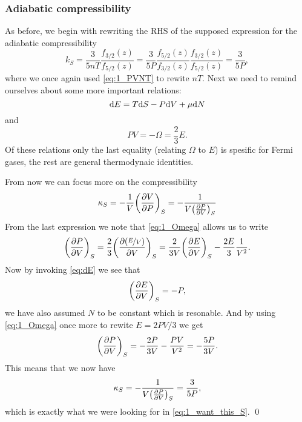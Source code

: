 \documentclass[11pt,letter, swedish, english
]{article}
\begin{document}
\subsubsection{Adiabatic compressibility}
As before, we begin with rewriting the RHS of the supposed expression
for the adiabatic compressibility
\begin{equation}\label{eq:1_want_this_S}
k_S=\frac{3}{5nT}\frac{f_{3/2}(z)}{f_{5/2}(z)}
=\frac{3}{5P}\frac{f_{5/2}(z)}{f_{3/2}(z)}\frac{f_{3/2}(z)}{f_{5/2}(z)}
=\frac{3}{5P},
\end{equation}
where we once again used \eqref{eq:1_PVNT} to rewite $nT$. Next we
need to remind ourselves about some more important relations:
\begin{equation}\label{eq:dE}
\mathrm{d}{E}=T\mathrm{d}{S}-P\mathrm{d}{V}+\mu\mathrm{d}{N}
\end{equation}
and
\begin{equation}\label{eq:1_Omega}
PV=-\Omega=\frac{2}{3}E.
\end{equation}
Of these relations only the last equality (relating $\Omega$ to $E$)
is spesific for Fermi gases, the rest are general thermodynaic
identities. 

From now we can focus more on the compressibility
\begin{equation}
\kappa_S=-\frac{1}{V}\qty(\pdv{V}{P})_S
=-\frac{1}{V\qty(\pdv{P}{V})_S}
\end{equation}
From the last expression we note that \eqref{eq:1_Omega} allows us to
write
\begin{equation}
\qty(\pdv{P}{V})_S=\frac{2}{3}\qty(\pdv{(\nicefrac{E}{V})}{V})_S
=\frac{2}{3V}\qty(\pdv{E}{V})_S-\frac{2E}{3}\frac{1}{V^2}.
\end{equation}
Now by invoking \eqref{eq:dE} we see that
\begin{equation}
\qty(\pdv{E}{V})_S=-P,
\end{equation}
we have also assumed $N$ to be constant which is resonable. And by
using \eqref{eq:1_Omega} once more to rewite $E=2PV/3$ we get
\begin{equation}
\qty(\pdv{P}{V})_S=-\frac{2P}{3V}-\frac{PV}{V^2}=-\frac{5P}{3V}.
\end{equation}
This means that we now have
\begin{equation}
\kappa_S=-\frac{1}{V\qty(\pdv{P}{V})_S}=\frac{3}{5P},
\end{equation}
which is exactly what we were looking for in
\eqref{eq:1_want_this_S}.\footnotemark{}
\qed

\end{document}
